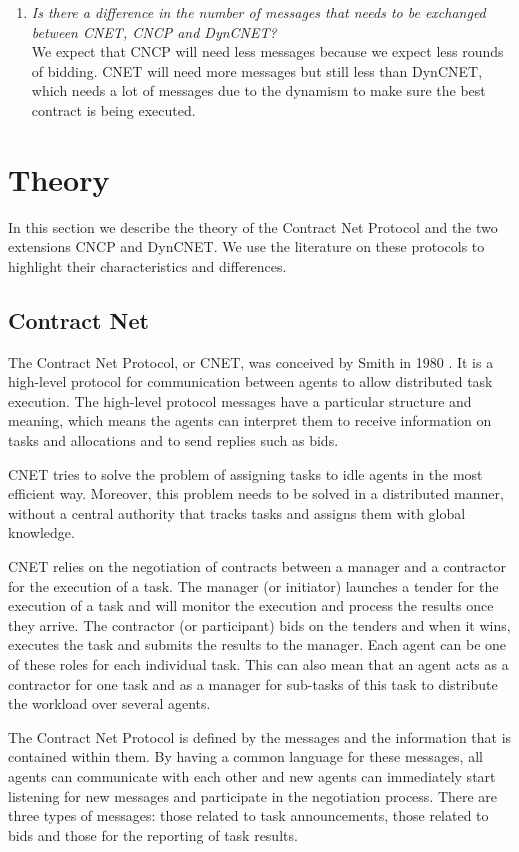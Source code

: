 \documentclass[10pt,a4paper,twocolumn]{article}
\begin{document}
\begin{enumerate}
\item\textit{Is there a difference in the number of messages that needs to be exchanged between CNET, CNCP and DynCNET?}\\
We expect that CNCP will need less messages because we expect less rounds of bidding. CNET will need more messages but still less than DynCNET, which needs a lot of messages due to the dynamism to make sure the best contract is being executed. 
\end{enumerate}

\section{Theory}

In this section we describe the theory of the Contract Net Protocol and the two extensions CNCP and DynCNET. We use the literature on these protocols to highlight their characteristics and differences.

\subsection{Contract Net} The Contract Net Protocol, or CNET, was conceived by Smith in 1980 \cite{CNET}. It is a high-level protocol for communication between agents to allow distributed task execution. The high-level protocol messages have a particular structure and meaning, which means the agents can interpret them to receive information on tasks and allocations and to send replies such as bids. 

CNET tries to solve the problem of assigning tasks to idle agents in the most efficient way. Moreover, this problem needs to be solved in a distributed manner, without a central authority that tracks tasks and assigns them with global knowledge.

CNET relies on the negotiation of contracts between a manager and a contractor for the execution of a task. The manager (or initiator) launches a tender for the execution of a task and will monitor the execution and process the results once they arrive. The contractor (or participant) bids on the tenders and when it wins, executes the task and submits the results to the manager. Each agent can be one of these roles for each individual task. This can also mean that an agent acts as a contractor for one task and as a manager for sub-tasks of this task to distribute the workload over several agents.

The Contract Net Protocol is defined by the messages and the information that is contained within them. By having a common language for these messages, all agents can communicate with each other and new agents can immediately start listening for new messages and participate in the negotiation process. There are three types of messages: those related to task announcements, those related to bids and those for the reporting of task results.
\end{document}
